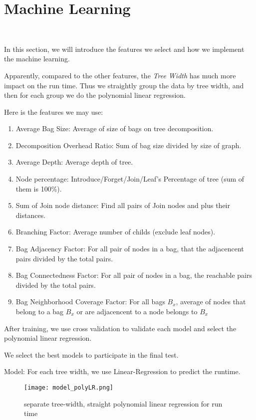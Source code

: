 \section{Machine Learning}~\label{sec.ML}

In this section, we will introduce the features we select and how we implement the machine learning.

Apparently, compared to the other features, the \textit{Tree Width} has much more impact on the run time. Thus we straightly group the data by tree width, and then for each group we do the polynomial linear regression.

Here is the features we may use:

\begin{enumerate}
    \item Average Bag Size: Average of size of bags on tree decomposition.
    \item Decomposition Overhead Ratio: Sum of bag size divided by size of graph.
    \item Average Depth: Average depth of tree.
    \item Node percentage: Introduce/Forget/Join/Leaf's Percentage of tree (sum of them is 100\%).
    \item Sum of Join node distance: Find all pairs of Join nodes and plus their distances.
    \item Branching Factor: Average number of childs (exclude leaf nodes).
    \item Bag Adjacency Factor: For all pair of nodes in a bag, that the adjacencent pairs divided by the total pairs.
    \item Bag Connectedness Factor: For all pair of nodes in a bag, the reachable pairs divided by the total pairs.
    \item Bag Neighborhood Coverage Factor: For all bags $B_{x}$, average of nodes that belong to a bag $B_{x}$ or are adjacencent to a node belongs to $B_{x}$
\end{enumerate}

After training, we use cross validation to validate each model and select the polynomial linear regression.

We select the best models to participate in the final test.

Model: For each tree width, we use Linear-Regression to predict the runtime.

\begin{figure}[h!]
    \centering
    \texttt{[image: model\_polyLR.png]}
    \caption{separate tree-width, straight polynomial linear regression for run time}
    \label{separate tree-width, straight polynomial linear regression for run time}
    \end{figure}

